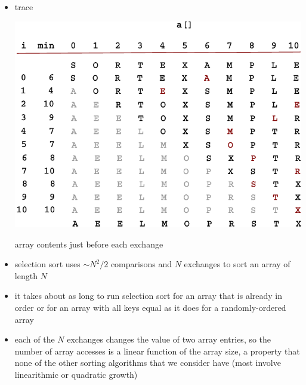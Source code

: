 \documentclass[8pt,a4paper,compress]{beamer}
\begin{document}
\begin{frame}[fragile]
\begin{itemize}
\item trace

\begin{center}
\includegraphics[scale=0.65]{./figures/selection_trace.pdf}

\smallskip

array contents just before each exchange
\end{center}
\end{itemize}
\end{frame}

\begin{frame}[fragile]
\begin{itemize}
\item selection sort uses $\sim N^2/2$ comparisons and $N$ exchanges to sort an array of length $N$

\item it takes about as long to run selection sort for an
array that is already in order or for an array with all keys equal as it does for a randomly-ordered array

\item each of the $N$ exchanges changes the value of two array
entries, so the number of array accesses is a linear function of the array size, a property that none of the other sorting algorithms that we consider have (most involve linearithmic or quadratic growth)
\end{itemize}
\end{frame}
\end{document}
